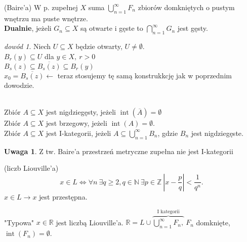 \documentclass[twoside,10pt]{article}
\theoremstyle{definition}
\theoremstyle{definition}
\theoremstyle{definition}
\theoremstyle{definition}
\theoremstyle{remark}
\newtheorem*{dd}{dowód}
\theoremstyle{definition}
\newtheorem*{uw}{Uwaga}
\theoremstyle{definition}
\theoremstyle{definition}
\theoremstyle{definition}
\theoremstyle{definition}
\theoremstyle{definition}
\begin{document}
\begin{tw} (Baire'a) W p. zupełnej $X$ suma $\bigcup\limits_{n=1}^\infty F_n$ zbiorów domkniętych o pustym wnętrzu ma puste wnętrze. \\ 
    \textbf{Dualnie}, jeżeli $G_n \subseteq X$ są otwarte i gęste to $\bigcap\limits_{n=1}^\infty G_n$ jest gęsty.
\end{tw} 
\begin{dd} 
    Niech $U \subseteq X$ będzie otwarty, $U \neq \emptyset$. \\ 
    $B_r(y) \subseteq U$ dla $y \in X,\ r > 0$ \\
    $B_s(z) \subseteq \overline{B_s(z)} \subseteq B_r(y)$ \\ 
    $x_0 = \overline{B_s(z)} \leftarrow$ teraz stosujemy tę samą konstrukkcję jak w poprzednim dowodzie.
\end{dd} 
\begin{df} ~\\
    Zbiór $ A \subseteq X$ jest nigdziegęsty, jeżeli $\operatorname{int}(\overline{A}) = \emptyset$ \\
    Zbiór $A \subseteq X$ jest brzegowy, jeżeli $\operatorname{int}(A) = \emptyset$. \\ 
    Zbiór $A \subseteq X$ jest I-kategorii, jeżeli $A \subseteq \bigcup\limits_{n=1}^\infty B_n$, gdzie $B_n$ jest nigdziegęste.
\end{df} 
\begin{uw} Z tw. Baire'a przestrzeń metryczne zupełna nie jest I-kategorii \end{uw}
\begin{df} (liczb Liouville'a)
    $$ x \in L \Leftrightarrow \forall n \ \exists q \ge 2, q \in \mathbb{N} \ \exists p \in \mathbb{Z} \ |x - \frac{p}{q}| < \frac{1}{q^n}. $$
    $x \in L \rightarrow x$ jest przestępna. \end{df}
    "Typowa" $x \in \mathbb{R}$ jest liczbą Liouville'a. $\mathbb{R} = L \cup \overbrace{\bigcup\limits_{n=1}^\infty F_n,}^{\text{I kategorii}} \ F_n$
    domknięte, $\operatorname{int}(F_n) = \emptyset$. 
\end{document}
